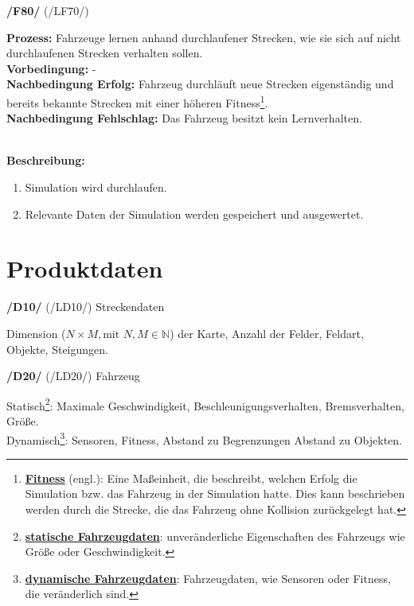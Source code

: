 \documentclass[11pt,a4paper]{article}
\begin{document}
	\noindent\large\textbf{/F80/} (/LF70/)
	\normalsize\\
	\begin{addmargin}{0.1 \textwidth}
		\textbf{Prozess:} Fahrzeuge lernen anhand durchlaufener Strecken, wie sie sich auf nicht durchlaufenen Strecken verhalten sollen.\\
		\textbf{Vorbedingung:} -\\
		\textbf{Nachbedingung Erfolg:} Fahrzeug durchläuft neue Strecken eigenständig und bereits bekannte Strecken mit einer höheren Fitness\footnote{\underline{\textbf{Fitness}} (engl.): Eine Maßeinheit, die beschreibt, welchen Erfolg die Simulation bzw. das Fahrzeug in der Simulation hatte. Dies kann beschrieben werden durch die Strecke, die das Fahrzeug ohne Kollision zurückgelegt hat.}.\\
		\textbf{Nachbedingung Fehlschlag:} Das Fahrzeug besitzt kein Lernverhalten.\\
		\\
		\begin{minipage}{\textwidth}
			\textbf{Beschreibung:}
			\begin{enumerate}
				\item Simulation wird durchlaufen.
				\item Relevante Daten der Simulation werden gespeichert und ausgewertet.\\
			\end{enumerate}
		\end{minipage}
	\end{addmargin}
	
	\pagebreak
	\section{Produktdaten}
	\noindent\large\textbf{/D10/} (/LD10/) Streckendaten
	\normalsize \\
	\begin{addmargin}{0.1 \textwidth}
		Dimension ($N \times M, \text{mit } N, M \in \mathbb{N}$) der Karte, Anzahl der Felder, Feldart, Objekte, Steigungen.\\
	\end{addmargin}

	\noindent\large\textbf{/D20/} (/LD20/) Fahrzeug
	\normalsize \\
	\begin{addmargin}{0.1 \textwidth}
		Statisch\footnote{\underline{\textbf{statische Fahrzeugdaten}}: unveränderliche Eigenschaften des Fahrzeugs wie Größe oder Geschwindigkeit.}: Maximale Geschwindigkeit, Beschleunigungsverhalten, Bremsverhalten, Größe. \\
		Dynamisch\footnote{\underline{\textbf{dynamische Fahrzeugdaten}}: Fahrzeugdaten, wie Sensoren oder Fitness, die veränderlich sind.}: Sensoren, Fitness, Abstand zu Begrenzungen Abstand zu Objekten.\\
	\end{addmargin}
\end{document}
